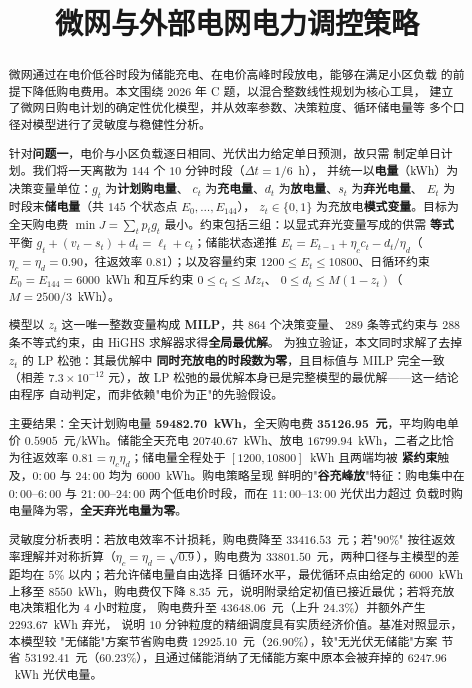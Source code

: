 \documentclass[withoutpreface,bwprint]{cumcmthesis}
\title{微网与外部电网电力调控策略}
\begin{document}
\maketitle

\begin{abstract}

微网通过在电价低谷时段为储能充电、在电价高峰时段放电，能够在满足小区负载
的前提下降低购电费用。本文围绕 2026 年 C 题，以混合整数线性规划为核心工具，
建立了微网日购电计划的确定性优化模型，并从效率参数、决策粒度、循环储电量等
多个口径对模型进行了灵敏度与稳健性分析。

针对\textbf{问题一}，电价与小区负载逐日相同、光伏出力给定单日预测，故只需
制定单日计划。我们将一天离散为 $144$ 个 $10$ 分钟时段（$\Delta t = 1/6$~h），
并统一以\textbf{电量}（kWh）为决策变量单位：$g_t$ 为\textbf{计划购电量}、
$c_t$ 为\textbf{充电量}、$d_t$ 为\textbf{放电量}、$s_t$ 为\textbf{弃光电量}、
$E_t$ 为时段末\textbf{储电量}（共 $145$ 个状态点 $E_0,\dots,E_{144}$），
$z_t \in \{0,1\}$ 为充放电\textbf{模式变量}。目标为全天购电费
$\min J = \sum_{t} p_t g_t$ 最小。约束包括三组：以显式弃光变量写成的供需
\textbf{等式}平衡 $g_t + (v_t - s_t) + d_t = \ell_t + c_t$；储能状态递推
$E_t = E_{t-1} + \eta_c c_t - d_t/\eta_d$（$\eta_c=\eta_d=0.90$，往返效率
$0.81$）；以及容量约束 $1200 \le E_t \le 10800$、日循环约束
$E_0 = E_{144} = 6000$~kWh 和互斥约束 $0 \le c_t \le Mz_t$、
$0 \le d_t \le M(1-z_t)$（$M = 2500/3$~kWh）。

模型以 $z_t$ 这一唯一整数变量构成 \textbf{MILP}，共 $864$ 个决策变量、
$289$ 条等式约束与 $288$ 条不等式约束，由 HiGHS 求解器求得\textbf{全局最优解}。
为独立验证，本文同时求解了去掉 $z_t$ 的 LP 松弛：其最优解中
\textbf{同时充放电的时段数为零}，且目标值与 MILP 完全一致（相差 $7.3\times
10^{-12}$ 元），故 LP 松弛的最优解本身已是完整模型的最优解——这一结论由程序
自动判定，而非依赖"电价为正"的先验假设。

主要结果：全天计划购电量 \textbf{59482.70~kWh}，全天购电费
\textbf{35126.95~元}，平均购电单价 $0.5905$~元/kWh。储能全天充电
$20740.67$~kWh、放电 $16799.94$~kWh，二者之比恰为往返效率
$0.81 = \eta_c\eta_d$；储电量全程处于 $[1200, 10800]$~kWh 且两端均被
\textbf{紧约束}触及，$0{:}00$ 与 $24{:}00$ 均为 $6000$~kWh。购电策略呈现
鲜明的"\textbf{谷充峰放}"特征：购电集中在 $0{:}00$--$6{:}00$ 与
$21{:}00$--$24{:}00$ 两个低电价时段，而在 $11{:}00$--$13{:}00$ 光伏出力超过
负载时购电量降为零，\textbf{全天弃光电量为零}。

灵敏度分析表明：若放电效率不计损耗，购电费降至 $33416.53$~元；若"$90\%$"
按往返效率理解并对称折算（$\eta_c=\eta_d=\sqrt{0.9}$），购电费为
$33801.50$~元，两种口径与主模型的差距均在 $5\%$ 以内；若允许储电量自由选择
日循环水平，最优循环点由给定的 $6000$~kWh 上移至 $8550$~kWh，购电费仅下降
$8.35$~元，说明附录给定初值已接近最优；若将充放电决策粗化为 $4$ 小时粒度，
购电费升至 $43648.06$~元（上升 $24.3\%$）并额外产生 $2293.67$~kWh 弃光，
说明 $10$ 分钟粒度的精细调度具有实质经济价值。基准对照显示，本模型较
"无储能"方案节省购电费 $12925.10$~元（$26.90\%$），较"无光伏无储能"方案
节省 $53192.41$~元（$60.23\%$），且通过储能消纳了无储能方案中原本会被弃掉的
$6247.96$~kWh 光伏电量。


\end{abstract}
\end{document}
